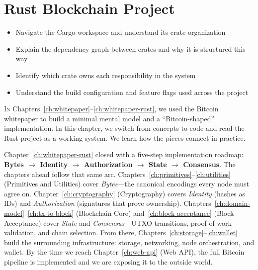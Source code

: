 \chapter{Rust Blockchain Project}
\label{ch:project-index}

\begin{learnbox}
\begin{itemize}
  \item Navigate the Cargo workspace and understand its crate organization
  \item Explain the dependency graph between crates and why it is structured this way
  \item Identify which crate owns each responsibility in the system
  \item Understand the build configuration and feature flags used across the project
\end{itemize}
\end{learnbox}

\lettrine{I}{n} Chapters~\ref{ch:whitepaper}--\ref{ch:whitepaper-rust}, we used the Bitcoin whitepaper to build a minimal mental model and a \textquotedblleft Bitcoin-shaped\textquotedblright{} implementation. In this chapter, we switch from concepts to code and read the Rust project as a working system. We learn how the pieces connect in practice.

Chapter~\ref{ch:whitepaper-rust} closed with a five-step implementation roadmap: \textbf{Bytes \(\to\) Identity \(\to\) Authorization \(\to\) State \(\to\) Consensus}. The chapters ahead follow that same arc. Chapters~\ref{ch:primitives}--\ref{ch:utilities} (Primitives and Utilities) cover \emph{Bytes}---the canonical encodings every node must agree on. Chapter~\ref{ch:cryptography} (Cryptography) covers \emph{Identity} (hashes as IDs) and \emph{Authorization} (signatures that prove ownership). Chapters~\ref{ch:domain-model}--\ref{ch:tx-to-block} (Blockchain Core) and~\ref{ch:block-acceptance} (Block Acceptance) cover \emph{State} and \emph{Consensus}---UTXO transitions, proof-of-work validation, and chain selection. From there, Chapters~\ref{ch:storage}--\ref{ch:wallet} build the surrounding infrastructure: storage, networking, node orchestration, and wallet. By the time we reach Chapter~\ref{ch:web-api} (Web API), the full Bitcoin pipeline is implemented and we are exposing it to the outside world.

